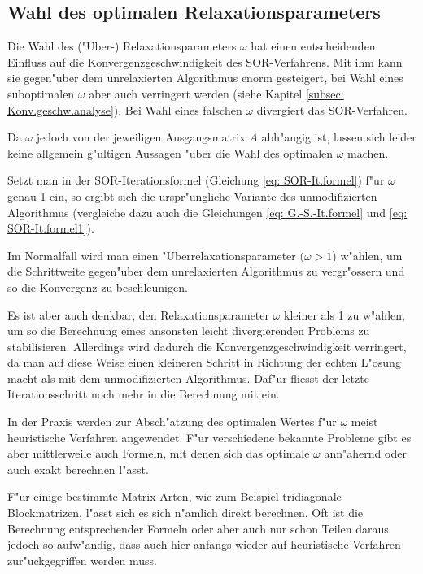\begin{refsection}
\section{Wahl des optimalen Relaxationsparameters}
Die Wahl des ("Uber-) Relaxationsparameters $\omega$ hat einen
entscheidenden Einfluss auf die Konvergenzgeschwindigkeit des
SOR-Verfahrens. Mit ihm kann sie gegen"uber dem unrelaxierten Algorithmus
enorm gesteigert, bei Wahl eines suboptimalen $\omega$ aber auch
verringert werden (siehe Kapitel \ref{subsec: Konv.geschw.analyse}). Bei
Wahl eines falschen $\omega$ divergiert das SOR-Verfahren.

Da $\omega$ jedoch von der jeweiligen Ausgangsmatrix $A$ abh"angig ist,
lassen sich leider keine allgemein g"ultigen Aussagen "uber die Wahl
des optimalen $\omega$ machen.

Setzt man in der SOR-Iterationsformel (Gleichung \ref{eq: SOR-It.formel})
f"ur $\omega$ genau 1 ein, so ergibt sich die urspr"ungliche Variante
des unmodifizierten Algorithmus (vergleiche dazu auch die Gleichungen
\ref{eq: G.-S.-It.formel} und \ref{eq: SOR-It.formel1}).

Im Normalfall wird man einen "Uberrelaxationsparameter $(\omega > 1$)
w"ahlen, um die Schrittweite gegen"uber dem unrelaxierten Algorithmus
zu vergr"ossern und so die Konvergenz zu beschleunigen.

Es ist aber auch denkbar, den Relaxationsparameter $\omega$ kleiner
als 1 zu w"ahlen, um so die Berechnung eines ansonsten leicht
divergierenden Problems zu stabilisieren. Allerdings wird dadurch die
Konvergenzgeschwindigkeit verringert, da man auf diese Weise einen
kleineren Schritt in Richtung der echten L"osung macht als mit dem
unmodifizierten Algorithmus. Daf"ur fliesst der letzte Iterationsschritt
noch mehr in die Berechnung mit ein.

In der Praxis werden zur Absch"atzung des optimalen Wertes f"ur $\omega$
meist heuristische Verfahren angewendet. F"ur verschiedene bekannte
Probleme gibt es aber mittlerweile auch Formeln, mit denen sich das
optimale $\omega$ ann"ahernd oder auch exakt berechnen l"asst.

F"ur einige bestimmte Matrix-Arten, wie zum Beispiel tridiagonale
Blockmatrizen, l"asst sich es sich n"amlich direkt berechnen. Oft ist die
Berechnung entsprechender Formeln oder aber auch nur schon Teilen daraus
jedoch so aufw"andig, dass auch hier anfangs wieder auf heuristische
Verfahren zur"uckgegriffen werden muss.


\end{refsection}

